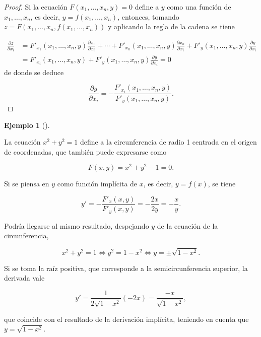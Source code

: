 \documentclass[
  a4paper,
]{scrreport}
\theoremstyle{plain}
\theoremstyle{plain}
\theoremstyle{definition}
\theoremstyle{definition}
\newtheorem{example}{Ejemplo}[chapter]
\theoremstyle{plain}
\theoremstyle{definition}
\theoremstyle{remark}
\begin{document}
\begin{tcolorbox}[enhanced jigsaw, rightrule=.15mm, toptitle=1mm, colbacktitle=quarto-callout-note-color!10!white, bottomrule=.15mm, opacityback=0, arc=.35mm, breakable, toprule=.15mm, left=2mm, coltitle=black, colback=white, opacitybacktitle=0.6, titlerule=0mm, colframe=quarto-callout-note-color-frame, bottomtitle=1mm, title=\textcolor{quarto-callout-note-color}{\faInfo}\hspace{0.5em}{Demostración}, leftrule=.75mm]

\begin{proof}

Si la ecuación \(F(x_1,\ldots,x_n,y)=0\) define a \(y\) como una función
de \(x_1, \ldots, x_n\), es decir, \(y=f(x_1,\ldots,x_n)\), entonces,
tomando \(z=F(x_1,\ldots,x_n,f(x_1,\ldots,x_n))\) y aplicando la regla
de la cadena se tiene

\begin{align*}
\frac{\partial z}{\partial x_i} 
&= F'_{x_1}(x_1,\ldots,x_n,y)\frac{\partial x_1}{\partial x_i} + \cdots + F'_{x_n}(x_1,\ldots,x_n,y)\frac{\partial x_n}{\partial x_i} + F'_{y}(x_1,\ldots,x_n,y)\frac{\partial y}{\partial x_i} \\
&= F'_{x_i}(x_1,\ldots,x_n,y) + F'_{y}(x_1,\ldots,x_n,y)\frac{\partial y}{\partial x_i} = 0
\end{align*} de donde se deduce

\[
\frac{\partial y}{\partial x_i} = -\frac{F'_{x_i}(x_1,\ldots,x_n,y)}{F'_{y}(x_1,\ldots,x_n,y)}.
\]

\end{proof}

\end{tcolorbox}

\begin{example}[]\protect\hypertarget{exm-derivada-implicita}{}\label{exm-derivada-implicita}

La ecuación \(x^2+y^2=1\) define a la circunferencia de radio 1 centrada
en el origen de coordenadas, que también puede expresarse como

\[
F(x,y) = x^2+y^2-1 = 0.
\]

Si se piensa en \(y\) como función implícita de \(x\), es decir,
\(y=f(x)\), se tiene

\[
y'=-\frac{F'_x(x,y)}{F'_y(x,y)} = -\frac{2x}{2y}=-\frac{x}{y}.
\]

Podría llegarse al mismo resultado, despejando \(y\) de la ecuación de
la circunferencia,

\[
x^2+y^2=1 \Leftrightarrow y^2=1-x^2 \Leftrightarrow y= \pm\sqrt{1-x^2}.
\]

Si se toma la raíz positiva, que corresponde a la semicircunferencia
superior, la derivada vale

\[
y' = \frac{1}{2\sqrt{1-x^2}}(-2x) = \frac{-x}{\sqrt{1-x^2}},
\]

que coincide con el resultado de la derivación implícita, teniendo en
cuenta que \(y=\sqrt{1-x^2}\).

\end{example}
\end{document}
